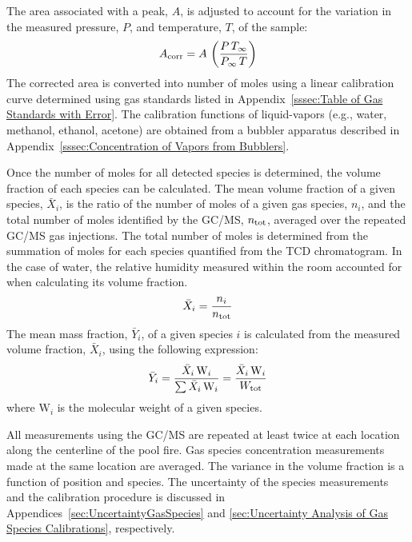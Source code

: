 \documentclass[12pt]{article}
\begin{document}
The area associated with a peak, $A$, is adjusted to account for the variation in the measured pressure, $P$, and temperature, $T$, of the sample:
\begin{equation}\label{eq:Area_corrected}
	A_{\rm corr} = A \, \left(\frac{P \, T_\infty}{P_\infty \, T} \right)
\end{equation}
The corrected area is converted into number of moles using a linear calibration curve determined using gas standards listed in Appendix~\ref{sssec:Table of Gas Standards with Error}. The calibration functions of liquid-vapors (e.g., water, methanol, ethanol, acetone) are obtained from a bubbler apparatus described in Appendix~\ref{sssec:Concentration of Vapors from Bubblers}.

Once the number of moles for all detected species is determined, the volume fraction of each species can be calculated. The mean volume fraction of a given species, $\bar{X}_{i}$, is the ratio of the number of moles of a given gas species, $n_{i}$, and the total number of moles identified by the GC/MS, $n_{\rm tot}$, averaged over the repeated GC/MS gas injections. The total number of moles is determined from the summation of moles for each species quantified from the TCD chromatogram. In the case of water, the relative humidity measured within the room accounted for when calculating its volume fraction.
\begin{equation}\label{eq:volume_fraction}
  	\bar{X}_{i}= \frac{n_{i}}{n_{\rm tot}}
\end{equation}
The mean mass fraction, $\bar{Y}_{i}$, of a given species $i$ is calculated from the measured volume fraction, $\bar{X}_{i}$, using the following expression:
\begin{equation}\label{eq:mass_fraction}
	\bar{Y}_{i}=\frac{\bar{X}_{i} \, {\textrm{W}_{i}}}{\sum{\bar{X}_{i} \, {\textrm{W}_{i}}}}=\frac{\bar{X}_{i} \, {\textrm{W}_{i}}}{W_{\rm{tot}}}
\end{equation}
where ${{\textrm{W}_{i}}}$ is the molecular weight of a given species.

All measurements using the GC/MS are repeated at least twice at each location along the centerline of the pool fire. Gas species concentration measurements made at the same location are averaged. The variance in the volume fraction is a function of position and species. The uncertainty of the species measurements and the calibration procedure is discussed in Appendices~\ref{sec:UncertaintyGasSpecies} and \ref{sec:Uncertainty Analysis of Gas Species Calibrations}, respectively.
\end{document}

